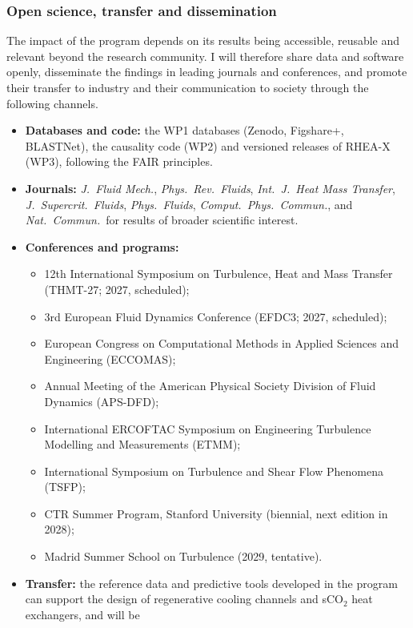 \documentclass[11pt]{article}
\begin{document}
\subsubsection{Open science, transfer and dissemination}

The impact of the program depends on its results being accessible, reusable and relevant beyond the
research community. I will therefore share data and software openly, disseminate the findings in
leading journals and conferences, and promote their transfer to industry and their communication to
society through the following channels.

\begin{itemize}
  \item \textbf{Databases and code:} the WP1 databases (Zenodo, Figshare+, BLASTNet), the
  causality code (WP2) and versioned releases of RHEA-X (WP3), following the FAIR principles.
  \item \textbf{Journals:} \emph{J.\ Fluid Mech.}, \emph{Phys.\ Rev.\ Fluids}, \emph{Int.\ J.\
  Heat Mass Transfer}, \emph{J.\ Supercrit.\ Fluids}, \emph{Phys.\ Fluids}, \emph{Comput.\ Phys.\
  Commun.}, and \emph{Nat.\ Commun.}\ for results of broader scientific interest.
  \item \textbf{Conferences and programs:}
  \begin{itemize}
    \item 12th International Symposium on Turbulence, Heat and Mass Transfer (THMT-27; 2027, scheduled);
    \item 3rd European Fluid Dynamics Conference (EFDC3; 2027, scheduled);
    \item European Congress on Computational Methods in Applied Sciences and Engineering (ECCOMAS);
    \item Annual Meeting of the American Physical Society Division of Fluid Dynamics (APS-DFD);
    \item International ERCOFTAC Symposium on Engineering Turbulence Modelling and Measurements (ETMM);
    \item International Symposium on Turbulence and Shear Flow Phenomena (TSFP);
    \item CTR Summer Program, Stanford University (biennial, next edition in 2028);
    \item Madrid Summer School on Turbulence (2029, tentative).
  \end{itemize}
  \item \textbf{Transfer:} the reference data and predictive tools developed in the program can
  support the design of regenerative cooling channels and sCO$_2$ heat exchangers, and will be

\end{itemize}
\end{document}
